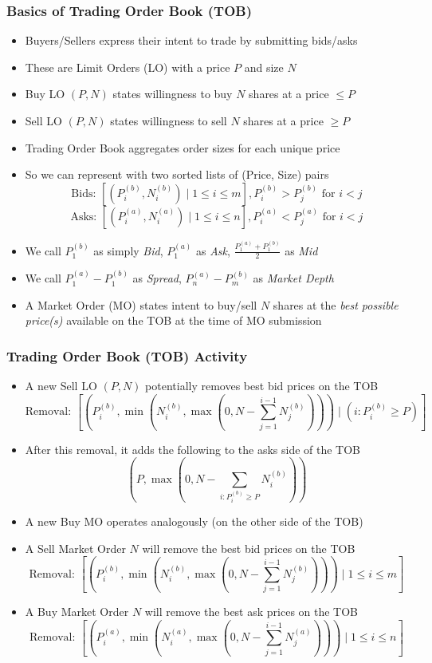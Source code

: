 \documentclass[handout]{beamer}
\begin{document}
\begin{frame}
\frametitle{Basics of Trading Order Book (TOB)}
\pause
\begin{itemize}[<+->]
\item Buyers/Sellers express their intent to trade by submitting bids/asks
\item These are Limit Orders (LO) with a price $P$ and size $N$
\item Buy LO $(P, N)$ states willingness to buy $N$ shares at a price $\leq P$
\item Sell  LO $(P, N)$ states willingness to sell $N$ shares at a price $\geq P$
\item Trading Order Book aggregates order sizes for each unique price
\item So we can represent with two sorted lists of (Price, Size) pairs
$$\mbox{Bids: } [(P_i^{(b)}, N_i^{(b)}) \mid 1 \leq i \leq m], P_i^{(b)} > P_j^{(b)} \mbox{ for } i < j$$
$$\mbox{Asks: } [(P_i^{(a)}, N_i^{(a)}) \mid 1 \leq i \leq n], P_i^{(a)} < P_j^{(a)} \mbox{ for } i < j$$
\item We call $P_1^{(b)}$ as simply {\em Bid}, $P_1^{(a)}$ as {\em Ask}, $\frac {P_1^{(a)} + P_1^{(b)}} 2$ as {\em Mid}
\item We call $P_1^{(a)} - P_1^{(b)}$ as {\em Spread}, $P_n^{(a)} - P_m^{(b)}$ as {\em Market Depth}
\item A Market Order (MO) states intent to buy/sell $N$ shares at the {\em best possible price(s)} available on the TOB at the time of MO submission
\end{itemize}
\end{frame}

\begin{frame}
\frametitle{Trading Order Book (TOB) Activity}
\pause
\begin{itemize}[<+->]
\item A new Sell LO $(P,N)$ potentially removes best bid prices on the TOB
$$\mbox{Removal: } [(P_i^{(b)}, \min(N_i^{(b)}, \max(0, N - \sum_{j=1}^{i-1} N_j^{(b)}))) \mid (i: P_i^{(b)} \geq P)]$$
\item After this removal, it adds the following to the asks side of the TOB 
$$(P, \max(0, N - \sum_{i: P_i^{(b)} \geq P}  N_i^{(b)}))$$
\item A new Buy MO operates analogously (on the other side of the TOB)
\item A Sell Market Order $N$ will remove the best bid prices on the TOB
$$\mbox{Removal: } [(P_i^{(b)}, \min(N_i^{(b)}, \max(0, N - \sum_{j=1}^{i-1} N_j^{(b)}))) \mid 1 \leq i \leq m]$$
\item A Buy Market Order $N$ will remove the best ask prices on the TOB
$$\mbox{Removal: } [(P_i^{(a)}, \min(N_i^{(a)}, \max(0, N - \sum_{j=1}^{i-1} N_j^{(a)}))) \mid 1 \leq i \leq n]$$
\end{itemize}
\end{frame}
\end{document}
